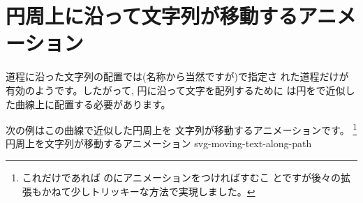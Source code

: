 \section{円周上に沿って文字列が移動するアニメーション}
道程に沿った文字列の配置では(名称から当然ですが)で指定さ
れた道程だけが有効のようです。したがって, 円に沿って文字を配列するために
は円をで近似した曲線上に配置する必要があります。

次の例はこの\Bezier 曲線で近似した円周上を
文字列が移動するアニメーションです。
\footnote{これだけであれば
のにアニメーションをつければすむこ
とですが後々の拡張もかねて少しトリッキーな方法で実現しました。}
{円周上を文字列が移動するアニメーション}
{svg-moving-text-along-path}

